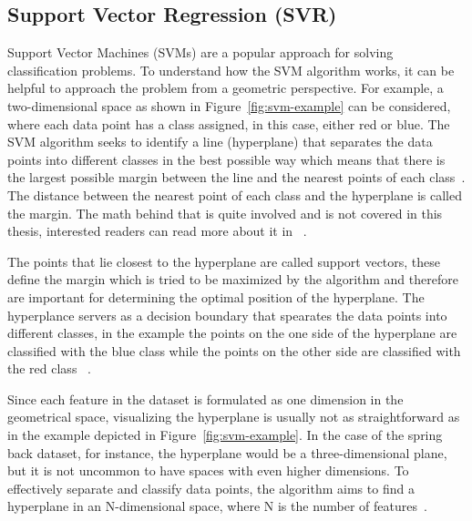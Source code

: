 \subsection{Support Vector Regression (SVR)}\label{subsec:support-vector-regression-(svr)}
Support Vector Machines (SVMs) are a popular approach for solving classification problems.
To understand how the SVM algorithm works, it can be helpful to approach the problem from a geometric perspective.
For example, a two-dimensional space as shown in Figure~\ref{fig:svm-example} can be considered, where each data point
has a class assigned, in this case, either red or blue.
The SVM algorithm seeks to identify a line (hyperplane) that separates the data points into different classes in the
best possible way which means that there is the largest possible margin between the line and the
nearest points of each class~\cite{muller_introductionmachinelearning_2016}.
The distance between the nearest point of each class and the hyperplane is called the margin.
The math behind that is quite involved and is not covered in this thesis, interested readers can read more about it
in ~\cite{hastie2009elements}.

The points that lie closest to the hyperplane are called support vectors, these define the margin which is tried to be
maximized by the algorithm and therefore are important for determining the optimal position of the hyperplane.
The hyperplance servers as a decision boundary that spearates the data points into different
classes, in the example the points on the one side of the hyperplane are classified with the blue class while the
points on
the other side are classified with the red class ~\cite[p. 42]{awad_efficientlearningmachines_2015}.

Since each feature in the dataset is formulated as one dimension in the geometrical space, visualizing the hyperplane
is usually not as straightforward as in the example depicted in Figure~\ref{fig:svm-example}.
In the case of the spring back dataset, for instance, the hyperplane would be a three-dimensional plane, but it is
not uncommon to have
spaces with even higher dimensions.
To effectively separate and classify data points, the algorithm aims to find a hyperplane in an N-dimensional space,
where N is the number of features~\cite[]{awad_efficientlearningmachines_2015}.

